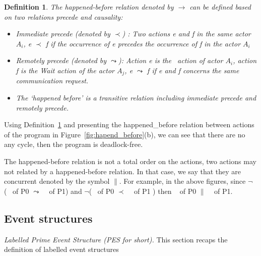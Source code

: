 \documentclass[a4paper,11pt]{article}
\newtheorem{definition}{Definition}
\begin{document}
\begin{definition}
  	\label{def:happedBefore2}
  The happened-before relation  denoted by  $\rightarrow $ can be defined based on two relations precede and causality: \begin{itemize}
  	\item Immediate precede (denoted by $ \prec$) :  Two actions e and f in the same actor $A_i$, e $ \prec$ f if the occurrence of e precedes the occurrence of f in the actor $A_i$  
  	\item Remotely precede (denoted by $\leadsto$): Action e is the \asynsend~action of actor $A_i$, action f is the Wait action of the actor $A_j$,  e $\leadsto$ f if e and f concerns the same communication request.
  \item The ‘happened before’ is a transitive relation including immediate precede and remotely precede.
  \end{itemize}\end{definition} 

Using Definition~\ref{def:happedBefore2} and presenting the happened\_before relation between actions of the program in Figure~\ref{fig:hapend_before}(b), we can see that there are no any cycle, then the program is deadlock-free.

The happened-before relation is not a total order on the actions, two actions may not related by a happened-before relation. In that case, we say that they are concurrent denoted by the symbol $\parallel$. For example, in the above figures, since $\neg$(\asynsend~ of P0 $\leadsto$ \asynsend~ of P1) and $\neg$(\asynsend~ of P0 $ \prec$  \asynsend~ of P1 ) then \asynsend~ of P0 $\parallel$ \asynsend~ of P1.  
\subsection{Event structures}
\textit{Labelled Prime Event Structure (PES for short).} This section recaps the definition of labelled event structures~\cite{DBLP:conf/concur/RodriguezSSK15}
\end{document}
